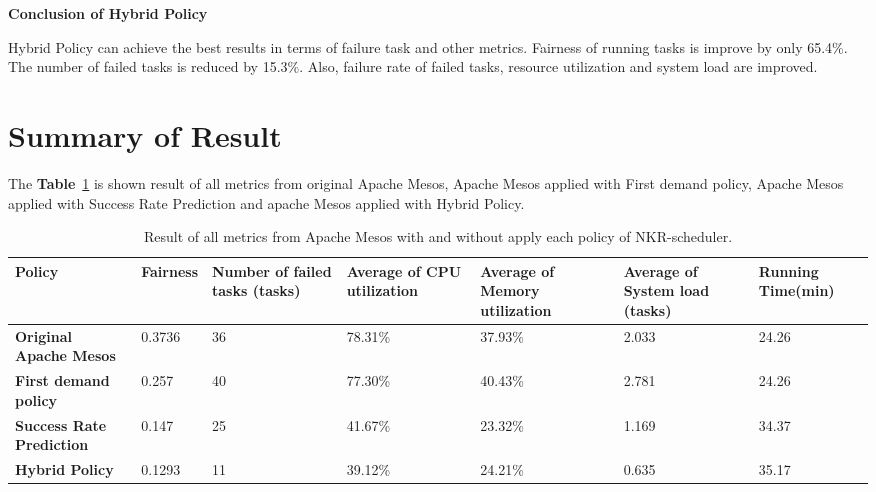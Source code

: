 \documentclass[12pt,oneside,openright,a4paper]{cpe-english-project}
\begin{document}
\newpage
\textbf{Conclusion of Hybrid Policy}
\newline

\hspace{10mm}Hybrid Policy can achieve the best results in terms of failure task and other metrics. Fairness of running tasks is improve by only 65.4\%. The number of failed tasks is reduced by 15.3\%. Also, failure rate of failed tasks, resource utilization and system load are improved.

\section{Summary of Result}  

\hspace{10mm}The \textbf{Table}~\ref{tbl:chap4Sum} is shown result of all metrics from original Apache Mesos, Apache Mesos applied with First demand policy, Apache Mesos applied with Success Rate Prediction and apache Mesos applied with Hybrid Policy.

  \begin{table}[!h]
  \caption{Result of all metrics from Apache Mesos with and without apply each policy of NKR-scheduler.}\label{tbl:chap4Sum}
  \begin{tabular}{@{}|p{}|p{}|p{}|p{}|p{}|p{}|p{}|}
   \hline
   \textbf{Policy} & \textbf{Fairness} & \textbf{Number of failed tasks (tasks)} & \textbf{Average of CPU utilization} & \textbf{Average of Memory utilization} & \textbf{Average of System load (tasks)} & \textbf{Running Time(min)} \\
   \hline
   \textbf{Original Apache Mesos}& 0.3736 & 36& 78.31\% & 37.93\% &2.033& 24.26 \\
   \hline
   \textbf{First demand policy} & 0.257& 40& 77.30\% & 40.43\% & 2.781& 24.26\\
   \hline
   \textbf{Success Rate Prediction}& 0.147& 25& 41.67\% & 23.32\%& 1.169& 34.37 \\
   \hline
   \textbf{Hybrid Policy} & 0.1293 & 11 & 39.12\% & 24.21\% & 0.635  & 35.17 \\ 
   \hline                   
  \end{tabular}
\end{table}

\end{document}
